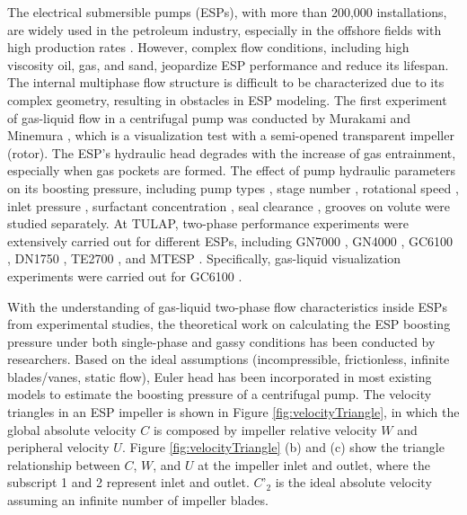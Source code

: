 \documentclass[preprint,12pt]{elsarticle}
\begin{document}
The electrical submersible pumps (ESPs), with more than 200,000 installations, are widely used in the petroleum industry, especially in the offshore fields with high production rates \cite{zhu2017phd}. However, complex flow conditions, including high viscosity oil, gas, and sand, jeopardize ESP performance and reduce its lifespan. The internal multiphase flow structure is difficult to be characterized due to its complex geometry, resulting in obstacles in ESP modeling. The first experiment of gas-liquid flow in a centrifugal pump was conducted by Murakami and Minemura \cite{murakami1974effects1,murakami1974effects2}, which is a visualization test with a semi-opened transparent impeller (rotor). The ESP’s hydraulic head degrades with the increase of gas entrainment, especially when gas pockets are formed. The effect of pump hydraulic parameters on its boosting pressure, including pump types \cite{cirilo1998air}, stage number \cite{pessoa2001experimental}, rotational speed \cite{zapata2003rotational}, inlet pressure \cite{salehi2012esp}, surfactant concentration \cite{zhu2018surfactant}, seal clearance \cite{zhu2019experiments}, grooves on volute \cite{shen2020study} were studied separately. At TULAP, two-phase performance experiments were extensively carried out for different ESPs, including GN7000 \cite{romero1999evaluation}, GN4000 \cite{cirilo1998air,romero1999evaluation}, GC6100 \cite{pessoa2001experimental,beltur2003analysis,duran2003pressure,zapata2003rotational,gamboa2009prediction}, DN1750 \cite{banjar2013experimental}, TE2700 \cite{salehi2012esp,zhu2017phd}, and MTESP \cite{zhu2020experimental}. Specifically, gas-liquid visualization experiments were carried out for GC6100 \cite{barrios2007visualization,gamboa2009prediction,trevisan2009modeling}.

With the understanding of gas-liquid two-phase flow characteristics inside ESPs from experimental studies, the theoretical work on calculating the ESP boosting pressure under both single-phase and gassy conditions has been conducted by researchers. Based on the ideal assumptions (incompressible, frictionless, infinite blades/vanes, static flow), Euler head has been incorporated in most existing models to estimate the boosting pressure of a centrifugal pump. The velocity triangles in an ESP impeller is shown in Figure \ref{fig:velocityTriangle}, in which the global absolute velocity $C$ is composed by impeller relative velocity $W$ and peripheral velocity $U$. Figure \ref{fig:velocityTriangle} (b) and (c) show the triangle relationship between $C$, $W$, and $U$ at the impeller inlet and outlet, where the subscript 1 and 2 represent inlet and outlet. $C’_2$ is the ideal absolute velocity assuming an infinite number of impeller blades. 
\end{document}
